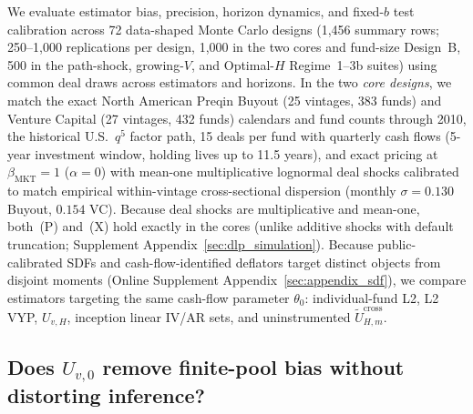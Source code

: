 \documentclass[12pt]{article}
\begin{document}
We evaluate estimator bias, precision, horizon dynamics, and fixed-$b$ test calibration across 72 data-shaped Monte Carlo designs (1,456 summary rows; 250--1,000 replications per design, 1,000 in the two cores and fund-size Design~B, 500 in the path-shock, growing-$V$, and Optimal-$H$ Regime~1--3b suites) using common deal draws across estimators and horizons.
In the two \emph{core designs}, we match the exact North American Preqin Buyout (25 vintages, 383 funds) and Venture Capital (27 vintages, 432 funds) calendars and fund counts through 2010, the historical U.S.\ $q^5$ factor path, 15 deals per fund with quarterly cash flows (5-year investment window, holding lives up to 11.5 years), and exact pricing at $\beta_{\mathrm{MKT}} = 1$ ($\alpha = 0$) with mean-one multiplicative lognormal deal shocks calibrated to match empirical within-vintage cross-sectional dispersion (monthly $\sigma = 0.130$ Buyout, $0.154$ VC).
Because deal shocks are multiplicative and mean-one, both~(P) and~(X) hold exactly in the cores (unlike additive shocks with default truncation; Supplement Appendix~\ref{sec:dlp_simulation}).
Because public-calibrated SDFs and cash-flow-identified deflators target distinct objects from disjoint moments (Online Supplement Appendix~\ref{sec:appendix_sdf}), we compare estimators targeting the same cash-flow parameter $\theta_0$: individual-fund L2, L2 VYP, $U_{v,H}$, inception linear IV/AR sets, and uninstrumented $\widetilde{U}_{H,m}^{\mathrm{cross}}$.

\subsection{Does $U_{v,0}$ remove finite-pool bias without distorting inference?}
\label{sec:mc_core}
\end{document}
